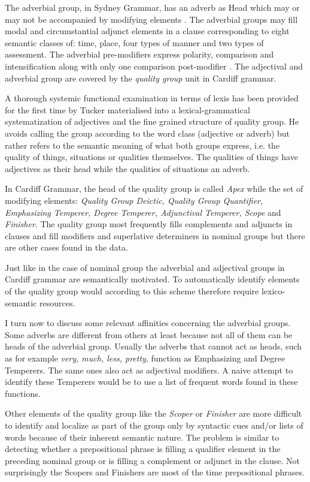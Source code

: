 	The adverbial group, in Sydney Grammar, has an adverb as Head which may or may not be accompanied by modifying elements \citep[419]{Halliday2013}. The adverbial groups may fill modal and circumstantial adjunct elements in a clause corresponding to eight semantic classes of: time, place, four types of manner and two types of assessment. The adverbial pre-modifiers express polarity, comparison and intensification along with only one comparison post-modifier \citep[420--421]{Halliday2013}. The adjectival and adverbial group are covered by the \textit{quality group} unit in Cardiff grammar.
    
	A thorough systemic functional examination in terms of lexis has been provided for the first time by Tucker \citet{Tucker1997,Tucker1998} materialised into a lexical-grammatical systematization of adjectives and the fine grained structure of quality group. He avoids calling the group according to the word class (adjective or adverb) but rather refers to the semantic meaning of what both groups express, i.e. the quality of things, situations or qualities themselves. The qualities of things have adjectives as their head while the qualities of situations an adverb.       
	
	In Cardiff Grammar, the head of the quality group is called \textit{Apex} while the set of modifying elements: \textit{Quality Group Deictic, Quality Group Quantifier, Emphasizing Temperer, Degree Temperer, Adjunctival Temperer, Scope} and \textit{Finisher}. The quality group most frequently fills complements and adjuncts in clauses and fill modifiers and superlative determiners in nominal groups but there are other cases found in the data. 
	
	Just like in the case of nominal group the adverbial and adjectival groups in Cardiff grammar are semantically motivated. To automatically identify elements of the quality group would according to this scheme therefore require lexico-semantic resources.
    
    I turn now to discuss some relevant affinities concerning the adverbial groups. Some adverbs are different from others at least because not all of them can be heads of the adverbial group. Usually the adverbs that cannot act as heads, such as for example \textit{very, much, less, pretty}, function as Emphasizing and Degree Temperers. The same ones also act as adjectival modifiers. A naive attempt to identify these Temperers would be to use a list of frequent words found in these functions.
    
    Other elements of the quality group like the \textit{Scoper} or \textit{Finisher} are more difficult to identify and localize as part of the group only by syntactic cues and/or lists of words because of their inherent semantic nature. The problem is similar to detecting whether a prepositional phrase is filling a qualifier element in the preceding nominal group or is filling a complement or adjunct in the clause. Not surprisingly the Scopers and Finishers are most of the time prepositional phrases. 
	
